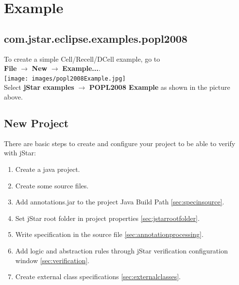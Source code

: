 \documentclass{article}
\begin{document}
\section{Example}

\subsection{com.jstar.eclipse.examples.popl2008}
To create a simple Cell/Recell/DCell example, go to\\ {\bf File} $\rightarrow$ {\bf New} $\rightarrow$ {\bf Example...}.\\

\texttt{[image: images/popl2008Example.jpg]}\\

Select {\bf jStar examples}  $\rightarrow$ {\bf POPL2008 Example} as shown in the picture above. 

\subsection{New Project}

There are basic steps to create and configure your project to be able to verify with jStar:

\begin{enumerate}
\item Create a java project.
\item Create some source files.
\item Add annotations.jar to the project Java Build Path \ref{sec:specinsource}.
\item Set jStar root folder in project properties \ref{sec:jstarrootfolder}.
\item Write specification in the source file \ref{sec:annotationprocessing}.
\item Add logic and abstraction rules through jStar verification configuration window \ref{sec:verification}.
\item Create external class specifications \ref{sec:externalclasses}.
\end{enumerate}
\end{document}
